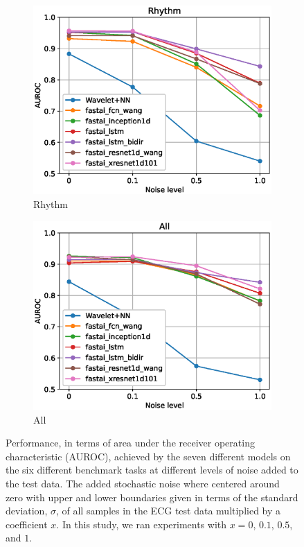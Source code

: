 \begin{figure}[hp]
\begin{subfigure}[b]{0.45\textwidth}
     \end{subfigure}
          \hfill
      \begin{subfigure}[b]{0.45\textwidth}
        \includegraphics[width=1.0\textwidth]{images/noise_rhythm.eps}
        \caption{Rhythm}
        \label{fig:gridsearch_rhythm}
     \end{subfigure}
     \hfill
     \begin{subfigure}[b]{0.45\textwidth}
        \includegraphics[width=1.0\textwidth]{images/noise_all.eps}
        \caption{All}
        \label{fig:gridsearch_all}
     \end{subfigure}
    \caption{Performance, in terms of area under the receiver operating characteristic (AUROC), achieved by the seven different models on the six different benchmark tasks at different levels of noise added to the test data. The added stochastic noise where centered around zero with upper and lower boundaries given in terms of the standard deviation, $\sigma$, of all samples in the ECG test data multiplied by a coefficient $x$. In this study, we ran experiments with $x=0$, $0.1$, $0.5$, and $1$. 
    }
    \label{fig:noise_spaghetti}
\end{figure}
\newpage
 
